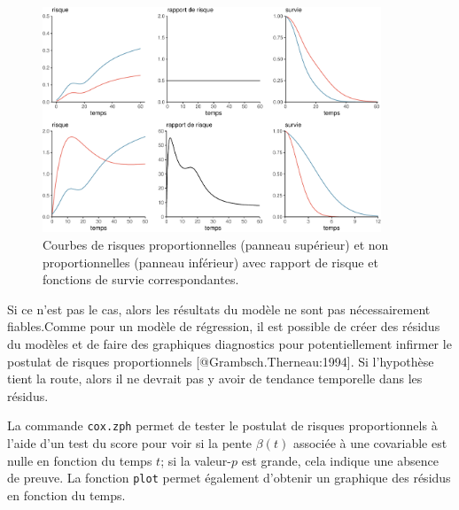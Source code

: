 \documentclass[
  11pt,
  letterpaper,
]{scrbook}
\theoremstyle{definition}
\theoremstyle{remark}
\begin{document}
\begin{figure}[ht!]

{\centering \includegraphics[width=0.9\textwidth,height=\textheight]{./06-survie_files/figure-pdf/fig-risquepropfig-1.pdf}

}

\caption{\label{fig-risquepropfig}Courbes de risques proportionnelles
(panneau supérieur) et non proportionnelles (panneau inférieur) avec
rapport de risque et fonctions de survie correspondantes.}

\end{figure}

Si ce n'est pas le cas, alors les résultats du modèle ne sont pas
nécessairement fiables.Comme pour un modèle de régression, il est
possible de créer des résidus du modèles et de faire des graphiques
diagnostics pour potentiellement infirmer le postulat de risques
proportionnels {[}@Grambsch.Therneau:1994{]}. Si l'hypothèse tient la
route, alors il ne devrait pas y avoir de tendance temporelle dans les
résidus.

La commande \texttt{cox.zph} permet de tester le postulat de risques
proportionnels à l'aide d'un test du score pour voir si la pente
\(\beta(t)\) associée à une covariable est nulle en fonction du temps
\(t\); si la valeur-\(p\) est grande, cela indique une absence de
preuve. La fonction \texttt{plot} permet également d'obtenir un
graphique des résidus en fonction du temps.
\end{document}
